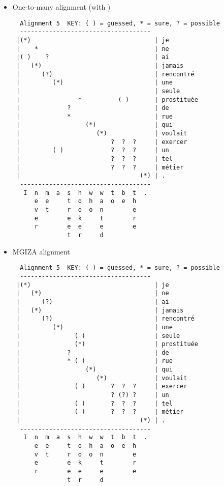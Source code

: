 \documentclass{article}[a4paper]
\begin{document}
\begin{itemize}
\begin{Verbatim}
    \end{Verbatim}
    \item One-to-many alignment (with )
    \begin{Verbatim}
  Alignment 5  KEY: ( ) = guessed, * = sure, ? = possible
  ------------------------------------
 |(*)                                  | je
 |    *                                | ne
 |( )    ?                             | ai
 |   (*)                               | jamais
 |      (?)                            | rencontré
 |         (*)                         | une
 |                                     | seule
 |                *          ( )       | prostituée
 |             ?                       | de
 |             *                       | rue
 |                  (*)                | qui
 |                     (*)             | voulait
 |                         ?  ?  ?     | exercer
 |         ( )             ?  ?  ?     | un
 |                         ?  ?  ?     | tel
 |                         ?  ?  ?     | métier
 |                                 (*) | .
  ------------------------------------
   I  n  m  a  s  h  w  w  t  b  t  . 
      e  e     t  o  h  a  o  e  h    
      v  t     r  o  o  n        e    
      e        e  k     t        r    
      r        e  e     e        e    
               t  r     d                 

    \end{Verbatim}
    \item MGIZA alignment
    \begin{Verbatim}
  Alignment 5  KEY: ( ) = guessed, * = sure, ? = possible
  ------------------------------------
 |(*)                                  | je
 |   (*)                               | ne
 |      (?)                            | ai
 |   (*)                               | jamais
 |      (?)                            | rencontré
 |         (*)                         | une
 |               ( )                   | seule
 |               (*)                   | prostituée
 |             ?                       | de
 |             * ( )                   | rue
 |                  (*)                | qui
 |                     (*)             | voulait
 |               ( )       ?  ?  ?     | exercer
 |                         ? (?) ?     | un
 |               ( )       ?  ?  ?     | tel
 |               ( )       ?  ?  ?     | métier
 |                                 (*) | .
  ------------------------------------
   I  n  m  a  s  h  w  w  t  b  t  . 
      e  e     t  o  h  a  o  e  h    
      v  t     r  o  o  n        e    
      e        e  k     t        r    
      r        e  e     e        e    
               t  r     d         
    \end{Verbatim}
    
    
\end{itemize}



\end{document}
